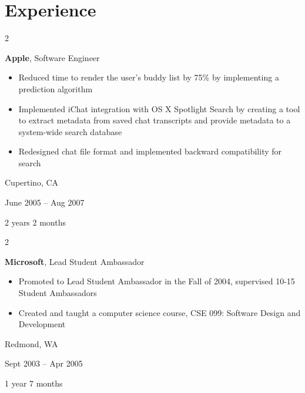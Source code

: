 \documentclass[10pt, letterpaper]{article}
\newenvironment{highlights}{
    \begin{itemize}[
        topsep=0.10 cm,
        parsep=0.10 cm,
        partopsep=0pt,
        itemsep=0pt,
        leftmargin=0.4 cm + 10pt
    ]
}{
    \end{itemize}
} %
\newenvironment{twocolentry}[2][]{
    \onecolentry
    \def\secondColumn{#2}
    \setcolumnwidth{\fill, 4.5 cm}
    \begin{paracol}{2}
}{
    \switchcolumn \raggedleft \secondColumn
    \end{paracol}
    \endonecolentry
} %
\begin{document}
    
    \section{Experience}



        
        \begin{twocolentry}{
            Cupertino, CA

        June 2005 – Aug 2007

        2 years 2 months
        }
            \textbf{Apple}, Software Engineer
            \begin{highlights}
                \item Reduced time to render the user's buddy list by 75\% by implementing a prediction algorithm
                \item Implemented iChat integration with OS X Spotlight Search by creating a tool to extract metadata from saved chat transcripts and provide metadata to a system-wide search database
                \item Redesigned chat file format and implemented backward compatibility for search
            \end{highlights}
        \end{twocolentry}


        \vspace{0.2 cm}

        \begin{twocolentry}{
            Redmond, WA

        Sept 2003 – Apr 2005

        1 year 7 months
        }
            \textbf{Microsoft}, Lead Student Ambassador
            \begin{highlights}
                \item Promoted to Lead Student Ambassador in the Fall of 2004, supervised 10-15 Student Ambassadors
                \item Created and taught a computer science course, CSE 099: Software Design and Development
            \end{highlights}
        \end{twocolentry}


        \vspace{0.2 cm}
\end{document}
